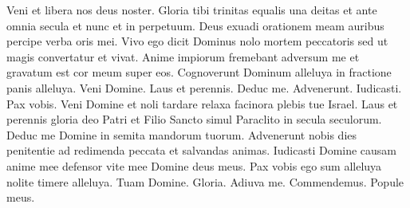 \begin{multicols*}{2}
 Veni et libera nos deus noster.
 Gloria tibi trinitas equalis una deitas et ante omnia secula et nunc et in perpetuum.
 Deus exuadi orationem meam auribus percipe verba oris mei.
 Vivo ego dicit Dominus nolo mortem peccatoris sed ut magis convertatur et vivat.
 Anime impiorum fremebant adversum me et gravatum est cor meum super eos.
 Cognoverunt Dominum alleluya in fractione panis alleluya.
 Veni Domine.
 Laus et perennis.
 Deduc me.
 Advenerunt.
 Iudicasti.
 Pax vobis.
 Veni Domine et noli tardare relaxa facinora plebis tue Israel.
 Laus et perennis gloria deo Patri et Filio Sancto simul Paraclito in secula seculorum.
 Deduc me Domine in semita mandorum tuorum.
 Advenerunt nobis dies penitentie ad redimenda peccata et salvandas animas.
 Iudicasti Domine causam anime mee defensor vite mee Domine deus meus.
 Pax vobis ego sum alleluya nolite timere alleluya.
 Tuam Domine.
 Gloria.
 Adiuva me.
 Commendemus.
 Popule meus.

\end{multicols*}
